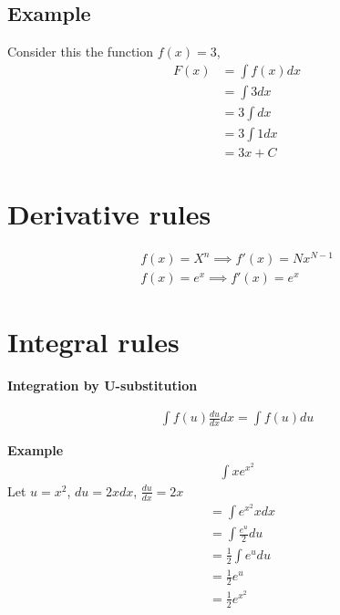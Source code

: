 \documentclass{article}
\begin{document}
\subsection{Example }

Consider this the function $f(x) = 3$, 
\begin{align}
    F(x) &= \int f(x) dx\\
    &=  \int 3 dx\\
    &= 3 \int dx \\
    &= 3 \int 1 dx\\
    &= 3x + C
\end{align}

\section{Derivative rules}

\begin{align}
    f(x) = X^n \implies f'(x) = Nx^{N - 1}\\
    f(x) = e^x \implies f'(x) = e^x
\end{align}

\section{Integral rules}
\textbf{Integration by U-substitution}

\begin{align}
    \int f(u) \frac{du}{dx}dx = \int f(u) du
\end{align}

\textbf{Example}
\begin{align}
    \int x e^{x^2}
\end{align}
Let $u = x^2$, $du = 2x dx$, $\frac{du}{dx} = 2x$
\begin{align}
   &= \int e^{x^2} x dx \\
    &= \int \frac{e^u}{2}du \\
    &= \frac{1}{2} \int e^u du \\
    &= \frac{1}{2} e^u \\
    &= \frac{1}{2} e^{x^2}
\end{align}
\end{document}
